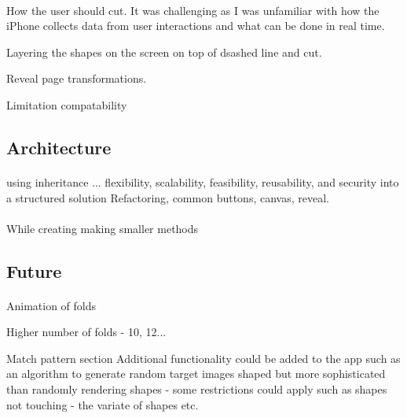 \documentclass[11pt]{article}
\begin{document}
        \paragraph{}
        How the user should cut. It was challenging as I was unfamiliar with how the iPhone collects data from user interactions and what can be done in real time. 
        
        
        Layering the shapes on the screen on top of dsashed line and cut.
        
        
        Reveal page transformations. 
        
        Limitation 
        compatability 
        
    \subsection{Architecture}
        
        \paragraph{}
using inheritance ... 
         flexibility, scalability, feasibility, reusability, and security into a structured solution
         Refactoring, common buttons, canvas, reveal. 
        
        \paragraph{}
        While creating making smaller methods
            
            
    \subsection{Future}
        
                \paragraph{}
                
                Animation of folds
                
                Higher number of folds - 10, 12...
                
                Match pattern section
                Additional functionality could be added to the app such as an algorithm to generate random target images shaped but more sophisticated than randomly rendering shapes - some restrictions could apply such as shapes not touching - the variate of shapes etc.
                
\end{document}
